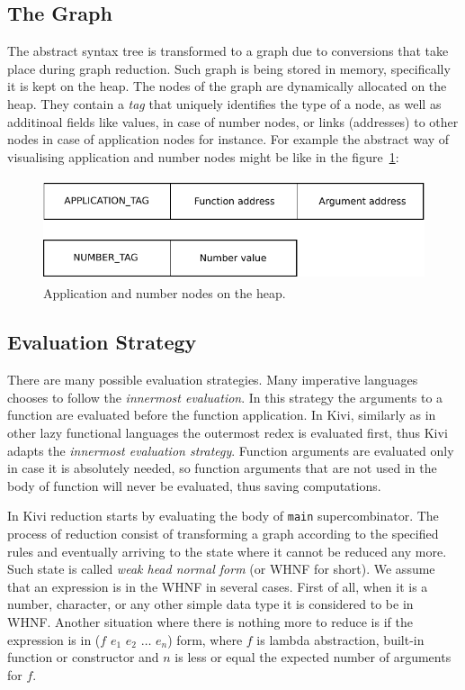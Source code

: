 \documentclass[12pt,a4paper]{report}
\begin{document}
\subsection{The Graph}
The abstract syntax tree is transformed to a graph due to conversions that take
place during graph reduction. Such graph is being stored in memory,
specifically it is kept on the heap. The nodes of the graph are dynamically
allocated on the heap. They contain a \textit{tag} that uniquely identifies the
type of a node, as well as additinoal fields like values, in case of number
nodes, or links (addresses) to other nodes in case of application nodes for
instance. For example the abstract way of visualising application and number
nodes might be like in the figure~\ref{fig:num_ap_nodes}:

\vspace*{0.2in}
\begin{figure}[h!]
  \centering
  \includegraphics[height=3cm]{nodes}
  \caption{Application and number nodes on the heap.}
  \label{fig:num_ap_nodes}
\end{figure}

\subsection{Evaluation Strategy}
There are many possible evaluation strategies. Many imperative languages
chooses to follow the \textit{innermost evaluation}. In this strategy the
arguments to a function are evaluated before the function application. In Kivi,
similarly as in other lazy functional languages the outermost redex is
evaluated first, thus Kivi adapts the \textit{innermost evaluation strategy}.
Function arguments are evaluated only in case it is absolutely needed, so
function arguments that are not used in the body of function will never be
evaluated, thus saving computations.

In Kivi reduction starts by evaluating the body of \texttt{main}
supercombinator. The process of reduction consist of transforming a graph
according to the specified rules and eventually arriving to the state where it
cannot be reduced any more. Such state is called \textit{weak head normal form}
(or WHNF for short). We assume that an expression is in the WHNF in several
cases. First of all, when it is a number, character, or any other simple data
type it is considered to be in WHNF. Another situation where there is nothing
more to reduce is if the expression is in ($f$ $e_1$ $e_2$ $\ldots$ $e_n$)
form, where $f$ is lambda abstraction, built-in function or constructor and $n$
is less or equal the expected number of arguments for $f$.
\end{document}
